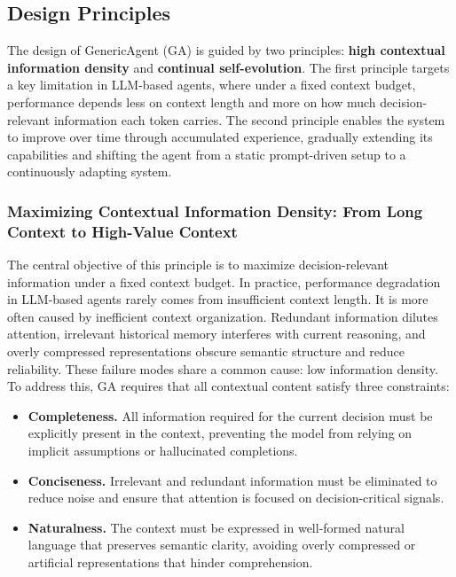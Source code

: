 \subsection{Design Principles}
\label{sec:principle}
\begin{AIbox}
The design of GenericAgent (GA) is guided by two principles: \textbf{high contextual information density} and \textbf{continual self-evolution}. The first principle targets a key limitation in LLM-based agents, where under a fixed context budget, performance depends less on context length and more on how much decision-relevant information each token carries. The second principle enables the system to improve over time through accumulated experience, gradually extending its capabilities and shifting the agent from a static prompt-driven setup to a continuously adapting system.
\end{AIbox}


\subsubsection{Maximizing Contextual Information Density: From Long Context to High-Value Context}

The central objective of this principle is to maximize decision-relevant information under a fixed context budget. In practice, performance degradation in LLM-based agents rarely comes from insufficient context length. It is more often caused by inefficient context organization. Redundant information dilutes attention, irrelevant historical memory interferes with current reasoning, and overly compressed representations obscure semantic structure and reduce reliability. These failure modes share a common cause: low information density. To address this, GA requires that all contextual content satisfy three constraints:
\begin{itemize}
    \item \textbf{Completeness.} {\small
    All information required for the current decision must be explicitly present in the context, preventing the model from relying on implicit assumptions or hallucinated completions.
    }

    \item \textbf{Conciseness.} {\small
    Irrelevant and redundant information must be eliminated to reduce noise and ensure that attention is focused on decision-critical signals.
    }

    \item \textbf{Naturalness.} {\small
    The context must be expressed in well-formed natural language that preserves semantic clarity, avoiding overly compressed or artificial representations that hinder comprehension.
    }
\end{itemize}

